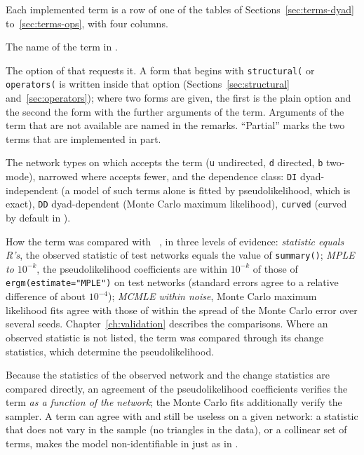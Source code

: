 Each implemented term is a row of one of the tables of Sections~\ref{sec:terms-dyad} to~\ref{sec:terms-ops}, with four columns.
\begin{description}[style=nextline,nosep]
  \item[ergm term] The name of the term in \ergm{}.
  \item[nwergm syntax and remarks] The option of \nwergm{} that requests it. A form that begins with \texttt{structural(} or \texttt{operators(} is written inside that option (Sections~\ref{sec:structural} and~\ref{sec:operators}); where two forms are given, the first is the plain option and the second the form with the further arguments of the \ergm{} term. Arguments of the \ergm{} term that are not available are named in the remarks. ``Partial'' marks the two terms that are implemented in part.
  \item[Types, class] The network types on which \ergm{} accepts the term (\texttt{u} undirected, \texttt{d} directed, \texttt{b} two-mode), narrowed where \nwergm{} accepts fewer, and the dependence class: \texttt{DI} dyad-independent (a model of such terms alone is fitted by pseudolikelihood, which is exact), \texttt{DD} dyad-dependent (Monte Carlo maximum likelihood), \texttt{curved} (curved by default in \ergm{}).
  \item[Validation against ergm] How the term was compared with \ergm{}~\ergmver{}, in three levels of evidence: \emph{statistic equals R's}, the observed statistic of test networks equals the value of \texttt{summary()}; \emph{MPLE to $10^{-k}$}, the pseudolikelihood coefficients are within $10^{-k}$ of those of \texttt{ergm(estimate="MPLE")} on test networks (standard errors agree to a relative difference of about $10^{-4}$); \emph{MCMLE within noise}, Monte Carlo maximum likelihood fits agree with those of \ergm{} within the spread of the Monte Carlo error over several seeds. Chapter~\ref{ch:validation} describes the comparisons. Where an observed statistic is not listed, the term was compared through its change statistics, which determine the pseudolikelihood.
\end{description}
Because the statistics of the observed network and the change statistics are compared directly, an agreement of the pseudolikelihood coefficients verifies the term \emph{as a function of the network}; the Monte Carlo fits additionally verify the sampler. A term can agree with \ergm{} and still be useless on a given network: a statistic that does not vary in the sample (no triangles in the data), or a collinear set of terms, makes the model non-identifiable in \nwergm{} just as in \ergm{}.

